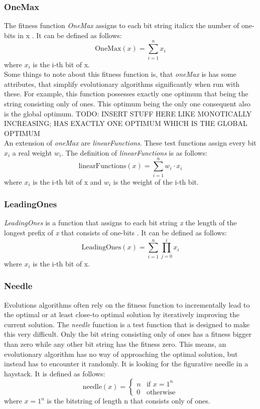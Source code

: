 \subsubsection{OneMax}
The fitness function \textit{OneMax} assigns to each bit string italic{x} the number of one-bits in x \cite{oneMax}. It can be defined as follows:
$$ \text{OneMax}(x) = \sum_{i=1}^{n} x_i $$
where $x_i$ is the i-th bit of x.\\
Some things to note about this fitness function is, that \textit{oneMax} is has some attributes, that simplify evolutionary algorithms   significantly when run with these. For example, this function possesses exactly one optimum that being the string consisting only of ones. This optimum being the only one consequent also is the global optimum.   TODO: INSERT STUFF HERE LIKE MONOTICALLY INCREASING; HAS EXACTLY ONE OPTIMUM WHICH IS THE GLOBAL OPTIMUM \\ 
An extension of \textit{oneMax} are \textit{linearFunctions}. These test functions assign every bit $x_i$ a real weight $w_i$. The definition of \textit{linearFunctions} is as follows:
$$ \text{linearFunctions}(x) = \sum_{i=1}^{n} w_i \cdot x_i $$
where $x_i$ is the i-th bit of x and $w_i$ is the weight of the i-th bit.\\

\subsubsection{LeadingOnes}
\textit{LeadingOnes} is a function that assigns to each bit string \textit{x} the length of the longest prefix of \textit{x} that consists of one-bits \cite{leadingOnes}. It can be defined as follows:
$$ \text{LeadingOnes}(x) = \sum_{i = 1}^{n} \prod_{j = 0}^{i}x_i $$
where $x_i$ is the i-th bit of x.\\

\subsubsection{Needle}
Evolutions algorithms often rely on the fitness function to incrementally lead to the optimal or at least close-to optimal solution by iteratively improving the current solution. The \textit{needle} function is a test function that is designed to make this very difficult. Only the bit string consisting only of ones has a fitness bigger than zero while any other bit string has the fitness zero. This means, an evolutionary algorithm has no way of approaching the optimal solution, but instead has to encounter it randomly. It is looking for the figurative needle in a haystack. It is defined as follows:
$$ \text{needle}(x) = \begin{cases} n & \text{if } x = 1^n \\ 0 & \text{otherwise} \end{cases} $$
where $x = 1^n$ is the bitstring of length n that consists only of ones.\\
